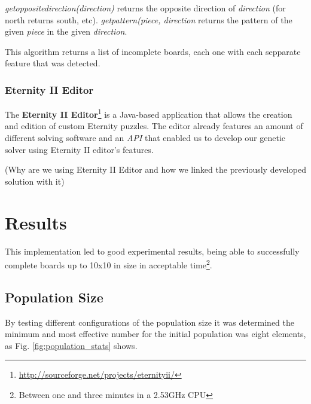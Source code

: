 \documentclass{llncs}
\begin{document}
\textit{getoppositedirection(direction)} returns the opposite direction of \textit{direction} (for north returns south, etc). \textit{getpattern(piece, direction} returns the pattern of the given \textit{piece} in the given \textit{direction}.

This algorithm returns a list of incomplete boards, each one with each sepparate feature that was detected.

\subsubsection{Eternity II Editor}\label{sec:eternity2_editor}

The \textbf{Eternity II Editor}\footnote{\url{http://sourceforge.net/projects/eternityii/}} is a Java-based application that allows the creation and edition of custom Eternity puzzles. The editor already features an amount of different solving software and an \textit{API} that enabled us to develop our genetic solver using Eternity II editor's features.


(Why are we using Eternity II Editor and how we linked the previously developed solution with it)

\section{Results}\label{sec:results}

This implementation led to good experimental results, being able to successfully complete boards up to 10x10 in size in acceptable time\footnote{Between one and three minutes in a 2.53GHz CPU}.

\subsection{Population Size}\label{sec:population_size}

By testing different configurations of the population size it was determined the minimum and most effective number for the initial population was eight elements, as Fig. \ref{fig:population_stats} shows.
\end{document}
